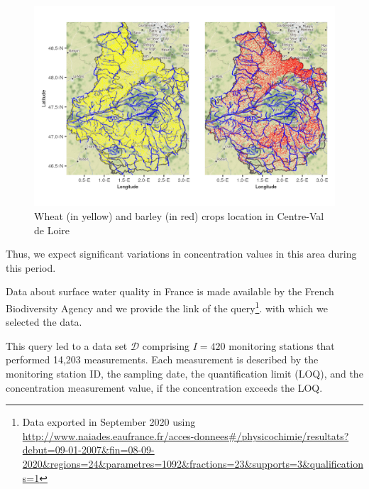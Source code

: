 \begin{figure}[htbp]
    \centering
    \includegraphics{figs/App/Occ_soil.png}
    \caption{Wheat (in yellow) and barley (in red) crops location in Centre-Val de Loire}
    \label{fig:crops}
\end{figure} 

Thus, we expect significant variations in concentration values in this area during this period. 

Data about surface water quality in France is made available by the French Biodiversity Agency \cite{Naiade} and we provide the link of the query\footnote{Data exported in September 2020 using \url{http://www.naiades.eaufrance.fr/acces-donnees\#/physicochimie/resultats?debut=09-01-2007&fin=08-09-2020&regions=24&parametres=1092&fractions=23&supports=3&qualifications=1}}.   with which we selected the data.

This query led to a data set $\mathcal D$ comprising $I = 420$ monitoring stations that performed 14,203 measurements. Each measurement is described by the monitoring station ID, the sampling date, the quantification limit (LOQ), and the concentration measurement value, if the concentration exceeds the LOQ. 


